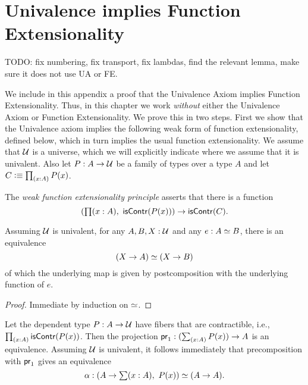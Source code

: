 \chapter{Univalence implies Function Extensionality}


TODO: fix numbering, fix transport, fix lambdas, find the relevant lemma, make sure it does not use UA or FE.

We include in this appendix a proof that the Univalence Axiom implies Function
Extensionality. Thus, in this chapter we work \emph{without} either the Univalence Axiom
or Function Extensionality. We prove this in two steps. First we show that the Univalence
axiom implies the following weak form of function extensionality, defined below, which in turn implies the usual function extensionality.
We assume that $\mathcal{U}$ is a universe, which we will explicitly indicate where we assume that it is univalent. Also let $P : A \to \mathcal{U}$ be a family of types over a type $A$ and let $C\defeq\prd{x:A}P(x)$.
\begin{defn}
The \emph{weak function extensionality principle} asserts that there is a function
\begin{equation*}
\left(\prd{x:A}\iscontr(P(x))\right)
  \to\iscontr(C).
\end{equation*}
\end{defn}

\begin{lem} \label{UA-eqv-hom-eqv}
Assuming $\mathcal{U}$ is univalent, for any $A,B,X:\mathcal{U}$ and any $e:A \simeq B$, there is an equivalence
\begin{equation*}
(X\to A) \simeq (X\to B)
\end{equation*}
of which the underlying map is given by postcomposition with the underlying function of $e$.
\end{lem}

\begin{proof}
Immediate by induction on $ \simeq $. 
\end{proof}

\begin{cor}
Let the dependent type $P:A\to\mathcal{U}$ have fibers that are contractible, i.e., $\prd{x:A}\iscontr(P(x))$.
Then the projection $\proj{1}:(\sm{x:A}P(x))\to A$ is an equivalence. Assuming $\mathcal{U}$ is univalent, it follows immediately that precomposition with $\mathsf{pr}_{1}$ gives an equivalence
\begin{equation*}
\alpha : \eqv{(A\to\sm{x:A}P(x))}{(A\to A)}.
\end{equation*}
\end{cor}

